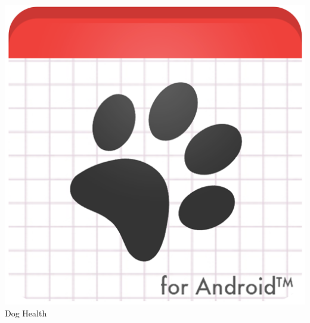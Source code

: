 \documentclass[14pt]{beamer}
\begin{document}
\begin{frame}
\begin{columns}
\begin{column}{0.3\textwidth}
\begin{center}
\includegraphics[scale =0.13]{Images/DogH.png}\\
\caption{Dog Health}
\end{center}
\end{column}
\end{columns}

\end{frame}
\end{document}
